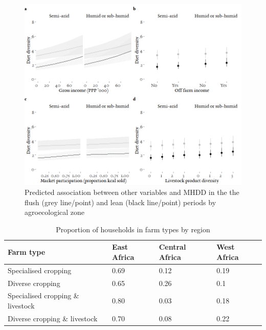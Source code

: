 \begin{figure}[H]
\includegraphics[width=1\textwidth]{Appendix/Ch6_3.png}
    \captionsetup{singlelinecheck = false, justification=justified} %
  \caption{Predicted association between other variables and MHDD in the the flush (grey line/point) and lean (black line/point) periods by agroecological zone}
  \label{fig:A_3}
\end{figure}



\begin{table}[H]
  \captionsetup{singlelinecheck = false, justification=justified}
  \caption{Proportion of households in farm types by region}
  \label{tab:C_8}
  \small
\begin{tabularx}{\textwidth}{@{}lYYY@{}}
\toprule
Farm type~ & East Africa & Central Africa & West Africa \\
\midrule
Specialised cropping & 0.69 & 0.12 & 0.19 \\
Diverse cropping & 0.65 & 0.26 & 0.1 \\
Specialised cropping \& livestock & 0.80 & 0.03 & 0.18 \\
Diverse cropping \& livestock & 0.70 & 0.08 & 0.22 \\
\bottomrule
\end{tabularx}
\end{table}

